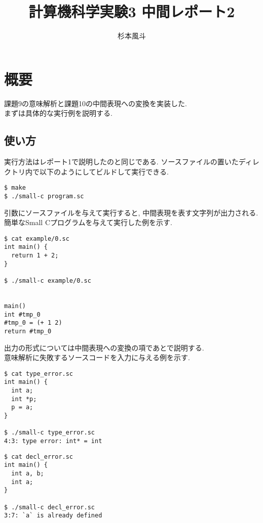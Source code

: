 \documentclass[a4j]{jarticle}
\begin{document}
\title{計算機科学実験3 中間レポート2}
\author{杉本風斗}

\maketitle

\section{概要}
課題9の意味解析と課題10の中間表現への変換を実装した. \\
まずは具体的な実行例を説明する.

\subsection{使い方}
実行方法はレポート1で説明したのと同じである. ソースファイルの置いたディレクトリ内で以下のようにしてビルドして実行できる. \\

\begin{verbatim}
$ make
$ ./small-c program.sc
\end{verbatim}

引数にソースファイルを与えて実行すると, 中間表現を表す文字列が出力される. \\
簡単なSmall Cプログラムを与えて実行した例を示す.

\begin{verbatim}
$ cat example/0.sc
int main() {
  return 1 + 2;
}

$ ./small-c example/0.sc


main()
int #tmp_0
#tmp_0 = (+ 1 2)
return #tmp_0

\end{verbatim}

出力の形式については中間表現への変換の項であとで説明する. \\

意味解析に失敗するソースコードを入力に与える例を示す. \\
\begin{verbatim}
$ cat type_error.sc
int main() {
  int a;
  int *p;
  p = a;
}

$ ./small-c type_error.sc
4:3: type error: int* = int

\end{verbatim}

\begin{verbatim}
$ cat decl_error.sc
int main() {
  int a, b;
  int a;
}

$ ./small-c decl_error.sc
3:7: `a` is already defined

\end{verbatim}
\end{document}
